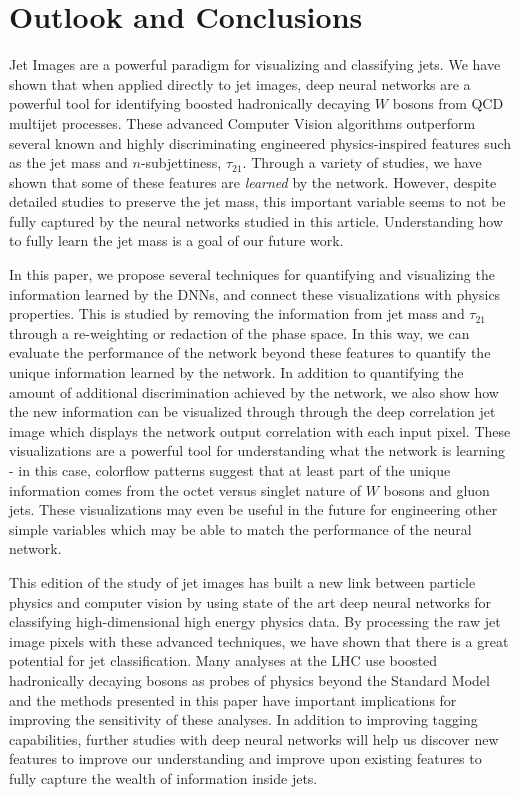 \section{Outlook and Conclusions}
\label{sec:conclusion}
Jet Images are a powerful paradigm for visualizing and classifying jets.  We have shown that when applied directly to jet images, deep neural networks are a powerful tool for identifying boosted hadronically decaying $W$ bosons from QCD multijet processes.  These advanced Computer Vision algorithms outperform several known and highly discriminating engineered physics-inspired features such as the jet mass and $n$-subjettiness, $\tau_{21}$.  Through a variety of studies, we have shown that some of these features are {\it learned} by the network.  However, despite detailed studies to preserve the jet mass, this important variable seems to not be fully captured by the neural networks studied in this article.  Understanding how to fully learn the jet mass is a goal of our future work.

In this paper, we propose several techniques for quantifying and visualizing the information learned by the DNNs, and connect these visualizations with physics properties.  This is studied by removing the information from jet mass and $\tau_{21}$ through a re-weighting or redaction of the phase space.  In this way, we can evaluate the performance of the network beyond these features to quantify the unique information learned by the network.  In addition to quantifying the amount of additional discrimination achieved by the network, we also show how the new information can be visualized through through the deep correlation jet image which displays the network output correlation with each input pixel.  These visualizations are a powerful tool for understanding what the network is learning - in this case, colorflow patterns suggest that at least part of the unique information comes from the octet versus singlet nature of $W$ bosons and gluon jets.  These visualizations may even be useful in the future for engineering other simple variables which may be able to match the performance of the neural network.  

This edition of the study of jet images has built a new link between particle physics and computer vision by using state of the art deep neural networks for classifying high-dimensional high energy physics data.  By processing the raw jet image pixels with these advanced techniques, we have shown that there is a great potential for jet classification.  Many analyses at the LHC use boosted hadronically decaying bosons as probes of physics beyond the Standard Model and the methods presented in this paper have important implications for improving the sensitivity of these analyses.  In addition to improving tagging capabilities, further studies with deep neural networks will help us discover new features to improve our understanding and improve upon existing features to fully capture the wealth of information inside jets.